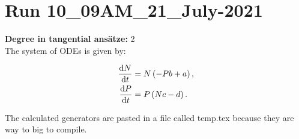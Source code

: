 \section*{Run 10\_09AM\_21\_July-2021}
\textbf{Degree in tangential ansätze:}	2\\
The system of ODEs is given by:

\begin{align*}
\dv{N}{t}&=N \left(- P b + a\right),\\
\dv{P}{t}&=P \left(N c - d\right).\\
\end{align*}

\noindent The calculated generators are pasted in a file called temp.tex because they are way to big to compile.

